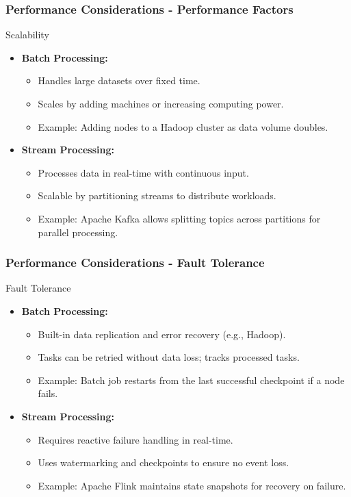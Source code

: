 \documentclass[aspectratio=169]{beamer}
\begin{document}
\begin{frame}[fragile]
  \frametitle{Performance Considerations - Performance Factors}
  \begin{block}{Scalability}
    \begin{itemize}
      \item \textbf{Batch Processing:}
        \begin{itemize}
          \item Handles large datasets over fixed time.
          \item Scales by adding machines or increasing computing power.
          \item Example: Adding nodes to a Hadoop cluster as data volume doubles.
        \end{itemize}
      \item \textbf{Stream Processing:}
        \begin{itemize}
          \item Processes data in real-time with continuous input.
          \item Scalable by partitioning streams to distribute workloads.
          \item Example: Apache Kafka allows splitting topics across partitions for parallel processing.
        \end{itemize}
    \end{itemize}
  \end{block}
\end{frame}

\begin{frame}[fragile]
  \frametitle{Performance Considerations - Fault Tolerance}
  \begin{block}{Fault Tolerance}
    \begin{itemize}
      \item \textbf{Batch Processing:}
        \begin{itemize}
          \item Built-in data replication and error recovery (e.g., Hadoop).
          \item Tasks can be retried without data loss; tracks processed tasks.
          \item Example: Batch job restarts from the last successful checkpoint if a node fails.
        \end{itemize}
      \item \textbf{Stream Processing:}
        \begin{itemize}
          \item Requires reactive failure handling in real-time.
          \item Uses watermarking and checkpoints to ensure no event loss.
          \item Example: Apache Flink maintains state snapshots for recovery on failure.
        \end{itemize}
    \end{itemize}
  \end{block}
\end{frame}
\end{document}
